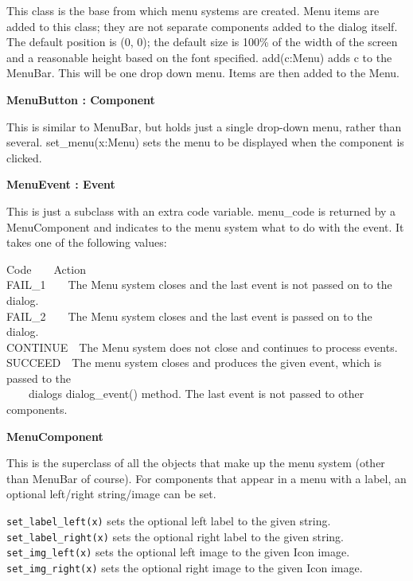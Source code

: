 This class is the base from which menu systems are created. Menu items
are added to this class; they are not separate components added to the
dialog itself. The default position is (0, 0); the default size is
100\% of the width of the screen and a reasonable height based on the
font specified. add(c:Menu) adds c to the MenuBar. This will be one
drop down menu. Items are then added to the Menu.

{\ttfamily\bfseries
{}MenuButton : Component}

This is similar to MenuBar, but holds just a single drop-down menu,
rather than several. set\_menu(x:Menu) sets the menu to be displayed
when the component is clicked.

{\ttfamily\bfseries
{}MenuEvent : Event}

This is just a subclass with an extra code variable. menu\_code is
returned by a MenuComponent and indicates to the menu system what to do
with the event. It takes one of the following values:

Code\ \ \ \ Action\\
FAIL\_1\ \ \ \ The Menu system closes and the last event is not passed
on to the dialog.\\
FAIL\_2\ \ \ \ The Menu system closes and the last event is passed on to
the dialog.\\
CONTINUE\ \ The Menu system does not close and continues to process
events.\\
SUCCEED\ \ The menu system closes and produces the given event, which is
passed to the\\
 \ \ \ \ dialog{\textquotesingle}s dialog\_event() method. The last
event is not passed to other components.

{\ttfamily\bfseries
{}MenuComponent}

This is the superclass of all the objects that make up the menu system
(other than MenuBar of course). For components that appear in a menu
with a label, an optional left/right string/image can be set.

\texttt{set\_label\_left(x)} sets the optional left label to the given
string.\\
\texttt{set\_label\_right(x)} sets the optional right label to the given
string.\\
\texttt{set\_img\_left(x)} sets the optional left image to the given Icon
image.\\
\texttt{set\_img\_right(x)} sets the optional right image to the given Icon
image.

